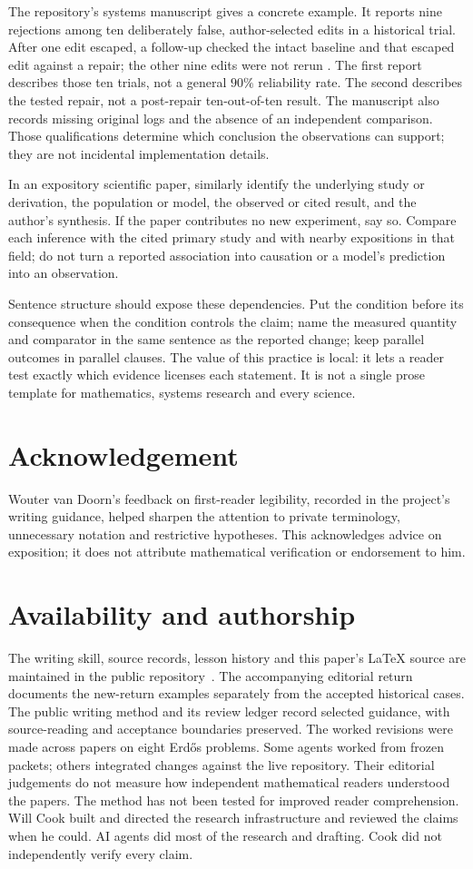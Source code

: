 The repository's systems manuscript gives a concrete example. It reports nine
rejections among ten deliberately false, author-selected edits in a historical
trial. After one edit escaped, a follow-up checked the intact baseline and
that escaped edit against a repair; the other nine edits were not rerun
\cite[recorded observations]{systems}. The first report describes those ten
trials, not a general $90\%$ reliability rate. The second describes the tested
repair, not a post-repair ten-out-of-ten result. The manuscript also records
missing original logs and the absence of an independent comparison. Those
qualifications determine which conclusion the observations can support; they
are not incidental implementation details.

In an expository scientific paper, similarly identify the underlying study or
derivation, the population or model, the observed or cited result, and the
author's synthesis. If the paper contributes no new experiment, say so.
Compare each inference with the cited primary study and with nearby expositions
in that field; do not turn a reported association into causation or a model's
prediction into an observation.

Sentence structure should expose these dependencies. Put the condition before
its consequence when the condition controls the claim; name the measured
quantity and comparator in the same sentence as the reported change; keep
parallel outcomes in parallel clauses. The value of this practice is local:
it lets a reader test exactly which evidence licenses each statement. It is
not a single prose template for mathematics, systems research and every
science.

\section*{Acknowledgement}
Wouter van Doorn's feedback on first-reader legibility, recorded in the project's
writing guidance, helped sharpen the attention to private terminology, unnecessary
notation and restrictive hypotheses. This acknowledges advice on exposition;
it does not attribute mathematical verification or endorsement to him.

\section*{Availability and authorship}
The writing skill, source records, lesson history and this paper's LaTeX source
are maintained in the public repository~\cite{ledger,skill}. The accompanying
editorial return documents the new-return examples separately from the accepted
historical cases. The public writing method and its review ledger record
selected guidance, with source-reading and acceptance boundaries preserved.
The worked revisions were made across papers on eight Erd\H{o}s problems.
Some agents worked from frozen packets; others integrated changes against the
live repository. Their editorial judgements do not measure how independent
mathematical readers understood the papers. The method has not been tested
for improved reader comprehension.
Will Cook built and directed the research infrastructure and reviewed
the claims when he could. AI agents did most of the research and drafting.
Cook did not independently verify every claim.
